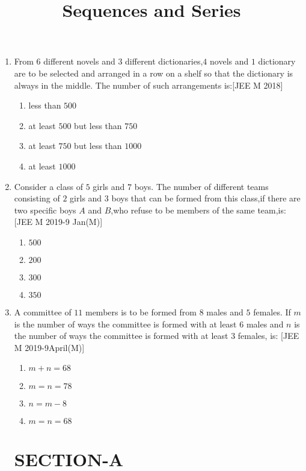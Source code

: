 \documentclass[journal,12pt,twocolumn]{IEEEtran}
\theoremstyle{remark}
\begin{document}
\begin{enumerate}
	\item From $6$ different novels and $3$ different dictionaries,$4$ novels and $1$ dictionary are to be selected and arranged in a row on a shelf so that  the dictionary is always in the middle. The number of such arrangements is:\hfill[JEE M 2018]
 \begin{enumerate}
     \item less than $500$ 
     \item at least $500$ but less than $750$
     \item at least $750$ but less than $1000$
     \item at least $1000$
     \end{enumerate}

	\item Consider a class of $5$ girls and $7$ boys. The number of different teams consisting of $2$ girls and $3$ boys that can be formed from this class,if there are two specific boys $A$ and $B$,who refuse to be members of the same team,is:\hfill[JEE M 2019-9 Jan(M)]
\begin{enumerate}
    \item $500$  
    \item $200$
    \item $300$
    \item $350$
    \end{enumerate}

	\item A committee of $11$ members is to be formed from $8$ males and $5$ females. If $m$ is the number of ways the committee is formed with at least $6$ males and $n$ is the number of ways the committee is formed with at least $3$ females, is:
    \hfill[JEE M 2019-9April(M)]
\begin{enumerate}
      \item $m+n=68$ 
      \item $m=n=78$
      \item $n=m-8$
      \item $m=n=68$
  \end{enumerate}  

\newpage 
\title{ Sequences and Series}
\maketitle
\section{SECTION-A}


\end{enumerate}
\end{document}
